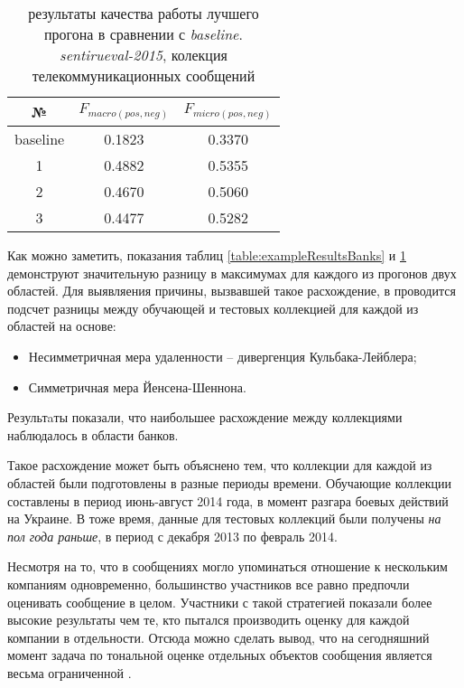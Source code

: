      \begin{table}[H]
        \centering
        \caption{результаты качества работы лучшего прогона в сравнении с {\it baseline}.
        {\it sentirueval-2015}, колекция телекоммуникационных сообщений}
        \label{table:exampleResultsTTK}
        \begin{tabular}{|c|c|c|}
        \hline
        №                       &       $F_{macro(pos, neg)}$        & $F_{micro(pos, neg)}$  \\ \hline
        baseline                &           0.1823                      &       0.3370              \\ \hline \hline
        1                       &           0.4882                      &       0.5355              \\ \hline
        2                       &           0.4670                      &       0.5060              \\ \hline
        3                       &           0.4477                      &       0.5282              \\ \hline
        \end{tabular}
     \end{table}

    Как можно заметить, показания таблиц \ref{table:exampleResultsBanks} и \ref{table:exampleResultsTTK}
    демонструют значительную разницу в максимумах для каждого из прогонов двух областей. Для выявляения причины, вызвавшей
    такое расхождение, в \cite{tonalityAnalisys} проводится подсчет разницы между обучающей
    и тестовых коллекцией для каждой из областей на основе:
    \begin{itemize}
        \item Несимметричная мера удаленности -- дивергенция Кульбака-Лейблера;
        \item Симметричная мера Йенсена-Шеннона.
    \end{itemize}

    Результaты показали, что наибольшее расхождение между коллекциями наблюдалось в
    области банков.

    Такое расхождение может быть объяснено тем, что коллекции для каждой из областей
    были подготовлены в разные периоды времени. Обучающие коллекции составлены в
    период июнь-август 2014 года, в момент разгара боевых действий на Украине.
    В тоже время, данные для тестовых коллекций были получены {\it на пол года раньше}, в период с
    декабря 2013 по февраль 2014.

    Несмотря на то, что в сообщениях могло упоминаться отношение к нескольким
    компаниям одновременно, большинство участников все равно предпочли
    оценивать сообщение в целом. Участники с такой стратегией показали
    более высокие результаты чем те, кто пытался производить оценку для каждой
    компании в отдельности. Отсюда можно сделать вывод, что на сегодняшний момент
    задача по тональной оценке отдельных объектов сообщения является весьма
    ограниченной \cite{tonalityAnalisys}.
